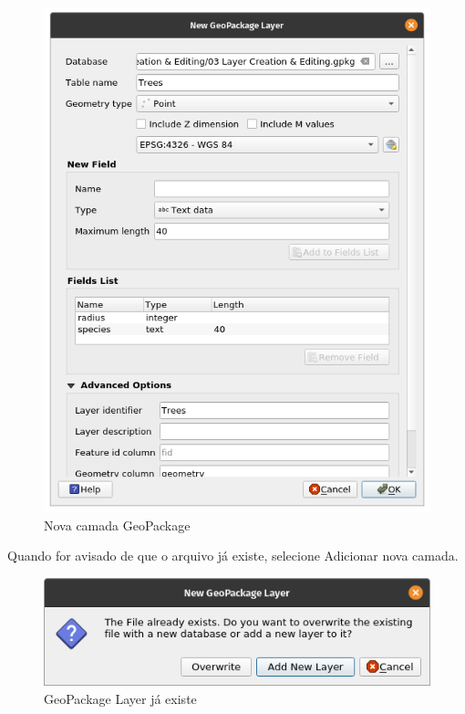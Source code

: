 \documentclass[
]{book}
\begin{document}
\begin{figure}
\centering
\includegraphics{media/modulo2/virtual-1.png}
\caption{Nova camada GeoPackage}
\end{figure}

Quando for avisado de que o arquivo já existe, selecione Adicionar nova camada.

\begin{figure}
\centering
\includegraphics{media/modulo2/virtual-2.png}
\caption{GeoPackage Layer já existe}
\end{figure}
\end{document}
